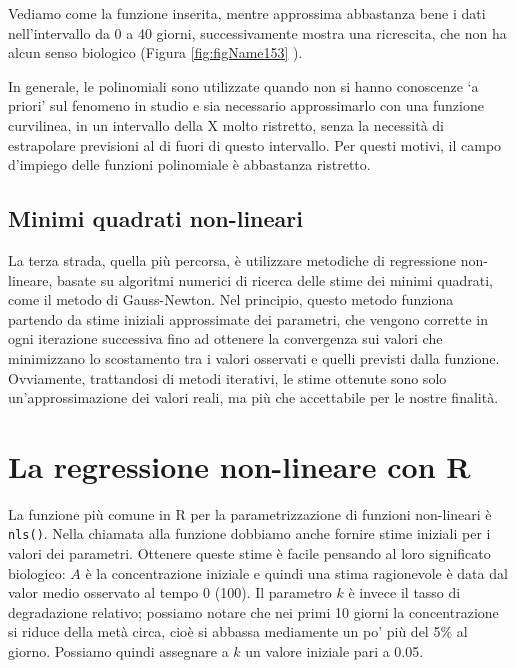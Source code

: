 \documentclass[a4paper,12pt,oneside]{book}
\begin{document}
Vediamo come la funzione inserita, mentre approssima abbastanza bene i dati nell'intervallo da 0 a 40 giorni, successivamente mostra una ricrescita, che non ha alcun senso biologico (Figura \ref{fig:figName153} ).

In generale, le polinomiali sono utilizzate quando non si hanno conoscenze `a priori' sul fenomeno in studio e sia necessario approssimarlo con una funzione curvilinea, in un intervallo della X molto ristretto, senza la necessità di estrapolare previsioni al di fuori di questo intervallo. Per questi motivi, il campo d'impiego delle funzioni polinomiale è abbastanza ristretto.

\hypertarget{minimi-quadrati-non-lineari}{%
\subsection{Minimi quadrati non-lineari}\label{minimi-quadrati-non-lineari}}

La terza strada, quella più percorsa, è utilizzare metodiche di regressione non-lineare, basate su algoritmi numerici di ricerca delle stime dei minimi quadrati, come il metodo di Gauss-Newton. Nel principio, questo metodo funziona partendo da stime iniziali approssimate dei parametri, che vengono corrette in ogni iterazione successiva fino ad ottenere la convergenza sui valori che minimizzano lo scostamento tra i valori osservati e quelli previsti dalla funzione. Ovviamente, trattandosi di metodi iterativi, le stime ottenute sono solo un'approssimazione dei valori reali, ma più che accettabile per le nostre finalità.

\hypertarget{la-regressione-non-lineare-con-r}{%
\section{La regressione non-lineare con R}\label{la-regressione-non-lineare-con-r}}

La funzione più comune in R per la parametrizzazione di funzioni non-lineari è \texttt{nls()}. Nella chiamata alla funzione dobbiamo anche fornire stime iniziali per i valori dei parametri. Ottenere queste stime è facile pensando al loro significato biologico: \(A\) è la concentrazione iniziale e quindi una stima ragionevole è data dal valor medio osservato al tempo 0 (100). Il parametro \(k\) è invece il tasso di degradazione relativo; possiamo notare che nei primi 10 giorni la concentrazione si riduce della metà circa, cioè si abbassa mediamente un po' più del 5\% al giorno. Possiamo quindi assegnare a \(k\) un valore iniziale pari a 0.05.
\end{document}
